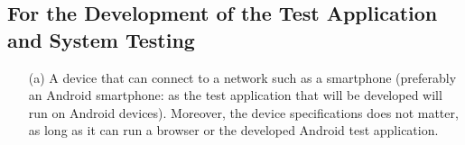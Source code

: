 \subsection{For the Development of the Test Application and System Testing}
\begin{itemize}
    \item[(a)] A device that can connect to a network such as a smartphone 
    (preferably an Android smartphone: as the test application that will 
    be developed will run on Android devices).  
    Moreover, the device specifications does not matter, as long as it 
    can run a browser or the developed Android test application.
\end{itemize}